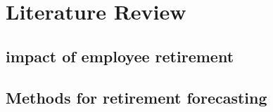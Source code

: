 \documentclass[12pt,letterpaper]{article}
\begin{document}


\section{Literature Review}
\subsection{impact of employee retirement}
\subsection{Methods for retirement forecasting}
\end{document}
